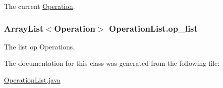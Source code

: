 The current \hyperlink{classOperation}{Operation}. 

\hypertarget{classOperationList_ad738b2ec75b157d945eea5dbdb6b2b9e}{
\subsubsection[{op\_\-list}]{\setlength{\rightskip}{0pt plus 5cm}ArrayList$<${\bf Operation}$>$ {\bf OperationList.op\_\-list}}}
\label{classOperationList_ad738b2ec75b157d945eea5dbdb6b2b9e}


The list op Operations. 



The documentation for this class was generated from the following file:\begin{DoxyCompactItemize}
\item 
\hyperlink{OperationList_8java}{OperationList.java}\end{DoxyCompactItemize}
